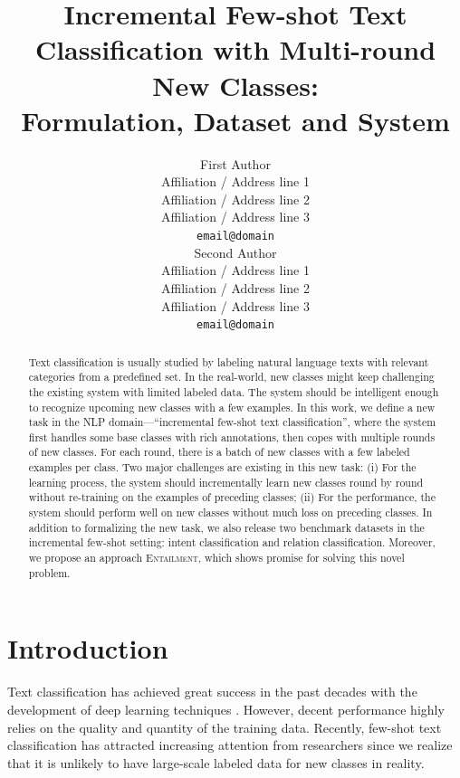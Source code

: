 \documentclass[11pt]{article}
\title{Incremental Few-shot Text Classification with Multi-round New Classes:\\Formulation, Dataset and System}
\author{First Author \\
  Affiliation / Address line 1 \\
  Affiliation / Address line 2 \\
  Affiliation / Address line 3 \\
  \texttt{email@domain} \\\And
  Second Author \\
  Affiliation / Address line 1 \\
  Affiliation / Address line 2 \\
  Affiliation / Address line 3 \\
  \texttt{email@domain} \\}
\newcommand{\modelname}{\textsc{Entailment}}
\begin{document}
\maketitle
\begin{abstract}
Text classification is usually studied by labeling natural language texts with relevant categories from a predefined set. In the real-world, new classes might keep challenging the existing system with limited labeled data. The system should be intelligent enough to recognize upcoming new classes with a few examples. In this work, we define a new task in the NLP domain---``incremental few-shot text classification'', where the system first handles some base classes with rich annotations, then copes with multiple rounds of new classes.
For each round, there is a batch of new classes with a few labeled examples per class. Two major challenges are existing in this new task:
(i) For the learning process, the system should incrementally learn new classes round by round without re-training on the examples of preceding classes; (ii) For the performance, the system should perform well on new classes without much loss on preceding classes. In addition to formalizing the new task, we also release two benchmark datasets in the incremental few-shot setting: intent classification and relation classification. Moreover, we propose an approach \modelname, which shows promise for solving this novel problem.
\end{abstract}


\section{Introduction}
Text classification has achieved great success in the past decades with the development of deep learning techniques \cite{kowsari2019text}. However, decent performance highly relies on the quality and quantity of the training data. Recently, few-shot text classification \cite{yu2018diverse} has attracted increasing attention from researchers since we realize that it is unlikely to have large-scale labeled data for new classes in reality. 
\end{document}
